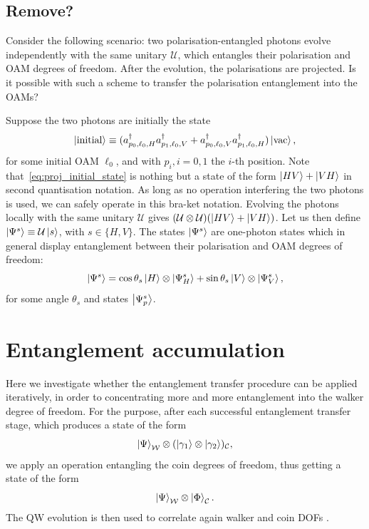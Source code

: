 \documentclass[
	aps, pra,
	superscriptaddress, twocolumn,
	floatfix,
	10pt
]{revtex4-1}
\newcommand{\on}[1]{\operatorname{#1}}
\newcommand{\parTitle}[1]{\noindent{\color{Mahogany}(\emph{#1})}}
\newcommand{\calC}{{\mathcal{C}}}
\newcommand{\calU}{{\mathcal{U}}}
\newcommand{\calW}{{\mathcal{W}}}
\begin{document}
\subsection{Remove?}
Consider the following scenario: two polarisation-entangled photons evolve independently with the same unitary $\mathcal U$, which entangles their polarisation and OAM degrees of freedom. After the evolution, the polarisations are projected. Is it possible with such a scheme to transfer the polarisation entanglement into the OAMs?

Suppose the two photons are initially the state
\begin{equation}
    \ket{\on{initial}}\equiv
    (a_{p_0,\ell_0,H}^\dagger
    a_{p_1,\ell_0,V}^\dagger +
    a_{p_0,\ell_0,V}^\dagger
    a_{p_1,\ell_0,H}^\dagger) \ket{\mathrm{vac}},
    \label{eq:proj_initial_state}
\end{equation}
for some initial OAM $\ell_0$, and with $p_i, i=0,1$ the $i$-th position.
Note that~\cref{eq:proj_initial_state} is nothing but a state of the form $\ket{HV}+\ket{VH}$ in second quantisation notation.
As long as no operation interfering the two photons is used, we can safely operate in this bra-ket notation.
Evolving the photons locally with the same unitary $\calU$ gives
$(\calU\otimes\calU)(\ket{HV}+\ket{VH})$.
Let us then define
$\ket{\Psi^s}\equiv\calU\ket s$, with $s\in\{H,V\}$.
The states $\ket{\Psi^s}$ are one-photon states which in general display entanglement between their polarisation and OAM degrees of freedom:
\begin{equation}
    \ket{\Psi^s}=
    \cos\theta_s \ket H\otimes\ket{\Psi^s_{H}} +
    \sin\theta_s \ket V\otimes\ket{\Psi^s_{V}},
\end{equation}
for some angle $\theta_s$ and states $\ket{\Psi^s_p}$.

\section{Entanglement accumulation}
\label{sec:entanglement_accumulation}

\parTitle{Section overview}
Here we investigate whether the entanglement transfer procedure can be applied iteratively, in order to concentrating more and more entanglement into the walker degree of freedom.
For the purpose, after each successful entanglement transfer stage, which produces a state of the form
\begin{equation}
	\ket{\Psi}_{\calW}\otimes(\ket{\gamma_1}\otimes\ket{\gamma_2})_{\calC},
\end{equation}
we apply an operation entangling the coin degrees of freedom, thus getting a state of the form
\begin{equation}
	\ket{\Psi}_{\calW}\otimes\ket{\Phi}_{\calC}.
\end{equation}
The QW evolution is then used to correlate again walker and coin DOFs .
\end{document}
